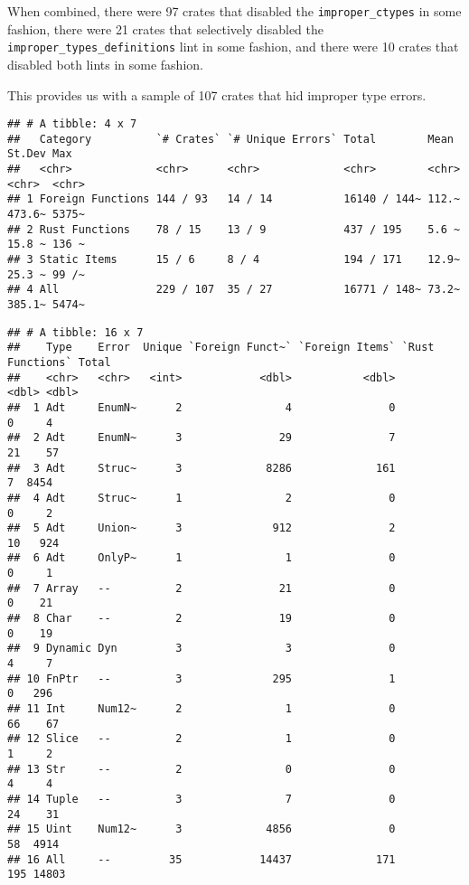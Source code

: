 \documentclass[
]{book}
\begin{document}
When combined, there were 97 crates that disabled the \texttt{improper\_ctypes} in some fashion, there were 21 crates that selectively disabled the \texttt{improper\_types\_definitions} lint in some fashion, and there were 10 crates that disabled both lints in some fashion.

This provides us with a sample of 107 crates that hid improper type errors.

\begin{verbatim}
## # A tibble: 4 x 7
##   Category          `# Crates` `# Unique Errors` Total        Mean  St.Dev Max  
##   <chr>             <chr>      <chr>             <chr>        <chr> <chr>  <chr>
## 1 Foreign Functions 144 / 93   14 / 14           16140 / 144~ 112.~ 473.6~ 5375~
## 2 Rust Functions    78 / 15    13 / 9            437 / 195    5.6 ~ 15.8 ~ 136 ~
## 3 Static Items      15 / 6     8 / 4             194 / 171    12.9~ 25.3 ~ 99 /~
## 4 All               229 / 107  35 / 27           16771 / 148~ 73.2~ 385.1~ 5474~
\end{verbatim}

\begin{verbatim}
## # A tibble: 16 x 7
##    Type    Error  Unique `Foreign Funct~` `Foreign Items` `Rust Functions` Total
##    <chr>   <chr>   <int>            <dbl>           <dbl>            <dbl> <dbl>
##  1 Adt     EnumN~      2                4               0                0     4
##  2 Adt     EnumN~      3               29               7               21    57
##  3 Adt     Struc~      3             8286             161                7  8454
##  4 Adt     Struc~      1                2               0                0     2
##  5 Adt     Union~      3              912               2               10   924
##  6 Adt     OnlyP~      1                1               0                0     1
##  7 Array   --          2               21               0                0    21
##  8 Char    --          2               19               0                0    19
##  9 Dynamic Dyn         3                3               0                4     7
## 10 FnPtr   --          3              295               1                0   296
## 11 Int     Num12~      2                1               0               66    67
## 12 Slice   --          2                1               0                1     2
## 13 Str     --          2                0               0                4     4
## 14 Tuple   --          3                7               0               24    31
## 15 Uint    Num12~      3             4856               0               58  4914
## 16 All     --         35            14437             171              195 14803
\end{verbatim}
\end{document}
